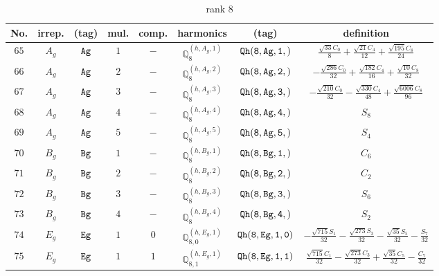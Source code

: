 \documentclass[fleqn,8pt]{jsarticle}
\begin{document}
\begin{table}[ht!]
\begin{center}
\caption{rank 8}
\renewcommand{\arraystretch}{1.3}
\begin{tabular}{cccccccc} \hline \hline
No. & irrep. & (tag) & mul. & comp. & harmonics & (tag) & definition \\ \hline
$ 65 $ & $ A_{g} $ & $ {\tt Ag} $ & $ 1 $ & $ - $ & $ \mathbb{Q}_{8}^{(h,A_{g},1)} $ & $ {\tt Qh(8,Ag,1,)} $ & $ \frac{\sqrt{33} C_{0}}{8} + \frac{\sqrt{21} C_{4}}{12} + \frac{\sqrt{195} C_{8}}{24} $ \\
$ 66 $ & $ A_{g} $ & $ {\tt Ag} $ & $ 2 $ & $ - $ & $ \mathbb{Q}_{8}^{(h,A_{g},2)} $ & $ {\tt Qh(8,Ag,2,)} $ & $ - \frac{\sqrt{286} C_{0}}{32} + \frac{\sqrt{182} C_{4}}{16} + \frac{\sqrt{10} C_{8}}{32} $ \\
$ 67 $ & $ A_{g} $ & $ {\tt Ag} $ & $ 3 $ & $ - $ & $ \mathbb{Q}_{8}^{(h,A_{g},3)} $ & $ {\tt Qh(8,Ag,3,)} $ & $ - \frac{\sqrt{210} C_{0}}{32} - \frac{\sqrt{330} C_{4}}{48} + \frac{\sqrt{6006} C_{8}}{96} $ \\
$ 68 $ & $ A_{g} $ & $ {\tt Ag} $ & $ 4 $ & $ - $ & $ \mathbb{Q}_{8}^{(h,A_{g},4)} $ & $ {\tt Qh(8,Ag,4,)} $ & $ S_{8} $ \\
$ 69 $ & $ A_{g} $ & $ {\tt Ag} $ & $ 5 $ & $ - $ & $ \mathbb{Q}_{8}^{(h,A_{g},5)} $ & $ {\tt Qh(8,Ag,5,)} $ & $ S_{4} $ \\
$ 70 $ & $ B_{g} $ & $ {\tt Bg} $ & $ 1 $ & $ - $ & $ \mathbb{Q}_{8}^{(h,B_{g},1)} $ & $ {\tt Qh(8,Bg,1,)} $ & $ C_{6} $ \\
$ 71 $ & $ B_{g} $ & $ {\tt Bg} $ & $ 2 $ & $ - $ & $ \mathbb{Q}_{8}^{(h,B_{g},2)} $ & $ {\tt Qh(8,Bg,2,)} $ & $ C_{2} $ \\
$ 72 $ & $ B_{g} $ & $ {\tt Bg} $ & $ 3 $ & $ - $ & $ \mathbb{Q}_{8}^{(h,B_{g},3)} $ & $ {\tt Qh(8,Bg,3,)} $ & $ S_{6} $ \\
$ 73 $ & $ B_{g} $ & $ {\tt Bg} $ & $ 4 $ & $ - $ & $ \mathbb{Q}_{8}^{(h,B_{g},4)} $ & $ {\tt Qh(8,Bg,4,)} $ & $ S_{2} $ \\
$ 74 $ & $ E_{g} $ & $ {\tt Eg} $ & $ 1 $ & $ 0 $ & $ \mathbb{Q}_{8,0}^{(h,E_{g},1)} $ & $ {\tt Qh(8,Eg,1,0)} $ & $ - \frac{\sqrt{715} S_{1}}{32} - \frac{\sqrt{273} S_{3}}{32} - \frac{\sqrt{35} S_{5}}{32} - \frac{S_{7}}{32} $ \\
$ 75 $ & $ E_{g} $ & $ {\tt Eg} $ & $ 1 $ & $ 1 $ & $ \mathbb{Q}_{8,1}^{(h,E_{g},1)} $ & $ {\tt Qh(8,Eg,1,1)} $ & $ \frac{\sqrt{715} C_{1}}{32} - \frac{\sqrt{273} C_{3}}{32} + \frac{\sqrt{35} C_{5}}{32} - \frac{C_{7}}{32} $ \\

\end{tabular}
\end{center}
\end{table}
\end{document}
